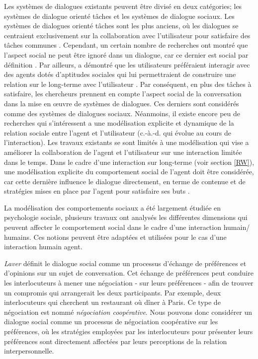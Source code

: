\documentclass [french]{sig-alternate-05-2015}
\begin{document}
\par Les systèmes de dialogues existants peuvent être divisé en deux catégories; les systèmes de dialogue orienté tâches et les systèmes de dialogue sociaux. Les systèmes de dialogues orienté tâches sont les plus anciens, où les dialogues se centraient  exclusivement sur la collaboration avec l’utilisateur pour satisfaire des tâches communes \cite{allen1995spoken, allen1996robust}. Cependant, un certain nombre de recherches ont montré que l’aspect social ne peut être ignoré dans un dialogue, car ce dernier est social par définition \cite{markopoulos2005case}. Par ailleurs, \cite{moon1998intimate} a démontré que les utilisateurs préféraient interagir avec des agents dotés d'aptitudes sociales qui lui permettraient de construire une relation sur le long-terme avec l'utilisateur \cite{bickmore2005establishing}. Par conséquent, en plus des tâches à satisfaire, les chercheurs prennent en compte l'aspect social de la conversation dans la mise en œuvre de systèmes de dialogues. Ces derniers sont considérés comme des systèmes de dialogues sociaux.
 Néanmoins, il existe encore peu de recherches qui s’intéressent a une modélisation explicite et dynamique de la relation sociale entre l’agent et l’utilisateur (c.-à.-d. qui évolue au cours de l'interaction). Les travaux existants se sont limités à une modélisation qui vise a améliorer la collaboration de l’agent et l'utilisateur sur une interaction limitée dans le temps. Dans le cadre d'une interaction sur long-terme (voir section \ref{RW}), une modélisation explicite du comportement social de l’agent doit être considérée, car cette dernière influence le dialogue directement, en terme de contenue et de stratégies mises en place par l’agent pour satisfaire ses buts \cite{bickmore2012empirical}.

\par La modélisation des comportements sociaux a été largement étudiée en psychologie sociale, plusieurs travaux ont analysés les différentes dimensions qui peuvent affecter le comportement social dans le cadre d’une interaction humain/ humains. Ces notions peuvent être adaptées et utilisées pour le cas d’une interaction humain agent.

 \par \emph{Laver}\cite{laver1981linguistic} définit le dialogue social comme un processus d'échange de préférences et d'opinions sur un sujet de conversation. Cet échange de préférences peut conduire les interlocuteurs à mener une négociation - sur leurs préférences - afin de trouver un compromis qui arrangerait les deux participants. Par exemple, deux interlocuteurs qui cherchent un restaurant où dîner à Paris. Ce type de négociation est nommé \emph{négociation coopérative}. Nous pouvons donc considérer un dialogue social comme un processus de négociation coopérative sur les préférences, où les stratégies employées par les interlocuteurs pour présenter leurs préférences sont directement affectées par leurs perceptions de la relation interpersonnelle.
\end{document}
